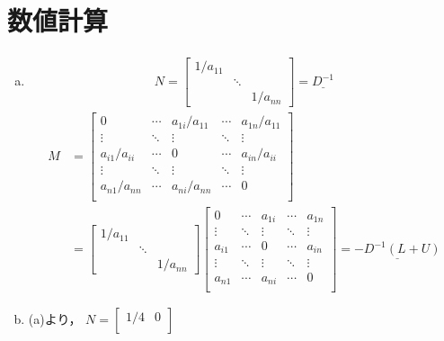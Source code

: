 \documentclass{jsarticle}
\theoremstyle{definition}
\begin{document}
  \section{数値計算}
  \begin{enumerate}[(a)]
    \item
    \begin{align*}
      N = 
      \begin{bmatrix}
        1/a_{11} & & \\
        & \ddots & \\
        & & 1/a_{nn}
      \end{bmatrix}
      = \underline{D^{-1}}
    \end{align*}
    \begin{align*}
      M &=
      \begin{bmatrix}
        0 & \cdots & a_{1i}/a_{11}  & \cdots & a_{1n}/a_{11} \\
        \vdots & \ddots  & \vdots  & \ddots & \vdots \\
        a_{i1}/a_{ii} & \cdots  & 0  & \cdots & a_{in}/a_{ii} \\
        \vdots & \ddots &  \vdots & \ddots & \vdots \\
        a_{n1}/a_{nn} & \cdots & a_{ni}/a_{nn} & \cdots & 0 \\
      \end{bmatrix} \\
      &=
      \begin{bmatrix}
        1/a_{11} & & \\
        & \ddots & \\
        & & 1/a_{nn}
      \end{bmatrix}
      \begin{bmatrix}
        0 & \cdots & a_{1i} & \cdots & a_{1n} \\
        \vdots & \ddots & \vdots & \ddots & \vdots \\
        a_{i1} & \cdots & 0  & \cdots & a_{in} \\
        \vdots & \ddots & \vdots & \ddots & \vdots \\
        a_{n1} & \cdots & a_{ni} & \cdots & 0 \\
      \end{bmatrix}
      = \underline{-D^{-1}(L+U)}
    \end{align*}
    \item (a)より，
    \begin{math}
      N=
      \begin{bmatrix}
        1/4 & 0 \\

\end{bmatrix}
\end{math}
\end{enumerate}
\end{document}
